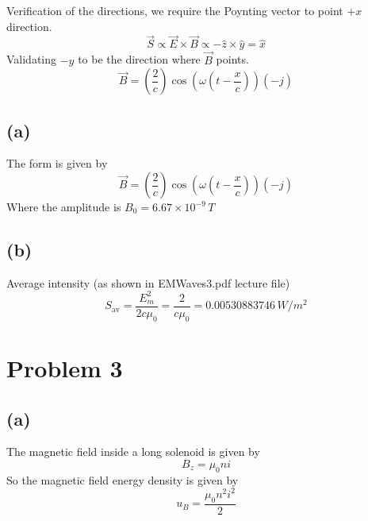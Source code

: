 \documentclass[a4paper]{article}
\begin{document}
\begin{figure}[H]
\end{figure}

Verification of the directions, we require the Poynting vector to point $+ x$ direction. 
\[
\vec{S} \propto \vec{E} \times \vec{B} \propto - \hat{z} \times \hat{y}   = 
\hat{x}
\] 
Validating $-y$ to be the direction where $\vec{B}$ points. 
\[
\vec{B} = 
\left(\frac{2}{c}\right)
\cos 
\left(
\omega 
\left(t - \frac{x}{c}\right)
\right) (- \hat{j})
\] 

\subsection*{(a)} 
The form is given by 
\[
\vec{B} = 
\left(\frac{2}{c}\right)
\cos 
\left(
\omega 
\left(t - \frac{x}{c}\right)
\right) (- \hat{j})
\] 
Where the amplitude is $B_0 = 6.67 \times 10^{-9} \, T$

\subsection*{(b)} 
Average intensity (as shown in EMWaves3.pdf lecture file) 
\[
S_\text{av} = \frac{E_m^2}{2 c \mu_0} = \frac{2}{c \mu_0} = 0.00530883746 \, W / m^2
\] 





\newpage
\section*{Problem 3} 
\subsection*{(a)} 
The magnetic field inside a long solenoid is given by 
\[
B_z = \mu_0 n i 
\]
So the magnetic field energy density is given by 
\[
u_B = \frac{\mu_0 n^2 i ^2}{2}
\]
\end{document}
